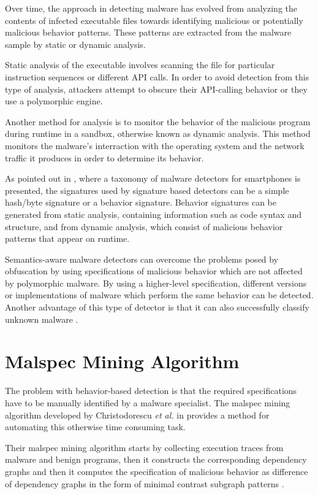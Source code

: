 Over time, the approach in detecting malware has evolved from analyzing the contents of infected executable files towards identifying malicious or potentially malicious behavior patterns. These patterns are extracted from the malware sample by static or dynamic analysis.

Static analysis of the executable involves scanning the file for particular instruction sequences or different API calls. In order to avoid detection from this type of analysis, attackers attempt to obscure their API-calling behavior or they use a polymorphic engine.

Another method for analysis is to monitor the behavior of the malicious program during runtime in a sandbox, otherwise known as dynamic analysis. This method monitors the malware's interraction with the operating system and the network traffic it produces in order to determine its behavior.

As pointed out in \cite{smartphone-malware-detection}, where a taxonomy of malware detectors for smartphones is presented, the signatures used by signature based detectors can be a simple hash/byte signature or a behavior signature. Behavior signatures can be generated from static analysis, containing information such as code syntax and structure, and from dynamic analysis, which consist of malicious behavior patterns that appear on runtime.

Semantics-aware malware detectors can overcome the problems posed by obfuscation by using specifications of malicious behavior which are not affected by polymorphic malware. By using a higher-level specification, different versions or implementations of malware which perform the same behavior can be detected. Another advantage of this type of detector is that it can also successfully classify unknown malware \cite{semantics-based-detection}.

\section{Malspec Mining Algorithm}
\label{sec:malspec-alg}

The problem with behavior-based detection is that the required specifications have to be manually identified by a malware specialist. The malspec mining algorithm developed by Christodorescu \textit{et al.} in \cite{mining-specifications} provides a method for automating this otherwise time consuming task. 

Their malspec mining algorithm starts by collecting execution traces from malware and benign programs, then it constructs the corresponding dependency graphs and then it computes the specification of malicious behavior as difference of dependency graphs in the form of minimal contrast subgraph patterns \cite{minimal-contrast-subgraph}.

